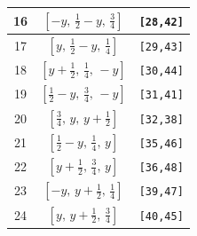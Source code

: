 \documentclass[fleqn,8pt]{jsarticle}
\begin{document}
\begin{longtable}{ccc}
16 & $\left[ - y,\, \frac{1}{2} - y,\, \frac{3}{4} \right]$ & {\tt [28,42]} \\ \hline
17 & $\left[ y,\, \frac{1}{2} - y,\, \frac{1}{4} \right]$ & {\tt [29,43]} \\ \hline
18 & $\left[ y + \frac{1}{2},\, \frac{1}{4},\, - y \right]$ & {\tt [30,44]} \\ \hline
19 & $\left[ \frac{1}{2} - y,\, \frac{3}{4},\, - y \right]$ & {\tt [31,41]} \\ \hline
20 & $\left[ \frac{3}{4},\, y,\, y + \frac{1}{2} \right]$ & {\tt [32,38]} \\ \hline
21 & $\left[ \frac{1}{2} - y,\, \frac{1}{4},\, y \right]$ & {\tt [35,46]} \\ \hline
22 & $\left[ y + \frac{1}{2},\, \frac{3}{4},\, y \right]$ & {\tt [36,48]} \\ \hline
23 & $\left[ - y,\, y + \frac{1}{2},\, \frac{1}{4} \right]$ & {\tt [39,47]} \\ \hline
24 & $\left[ y,\, y + \frac{1}{2},\, \frac{3}{4} \right]$ & {\tt [40,45]} \\
\end{longtable}
\renewcommand{\arraystretch}{1.2}
\end{document}
